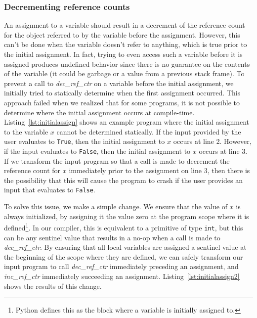 \documentclass{sigplanconf}
\newcommand{\avariable}[1]{\ensuremath{#1}}
\newcommand{\aliteral}[1]{\texttt{#1}}
\newcommand{\afunction}[1]{\textit{#1}}
\newcommand{\atype}[1]{\texttt{#1}}
\begin{document}
\subsubsection{Decrementing reference counts}
An assignment to a variable should result in a decrement of the reference count for the object referred to by the variable before the assignment.  However, this can't be done when the variable doesn't refer to anything, which is true prior to the initial assignment.  In fact, trying to even access such a variable before it is assigned produces undefined behavior since there is no guarantee on the contents of the variable (it could be garbage or a value from a previous stack frame).   To prevent a call to \afunction{dec\_ref\_ctr} on a variable before the initial assignment, we initially tried to statically determine when the first assignment occurred.  This approach failed when we realized that for some programs, it is not possible to determine where the initial assignment occurs at compile-time.  Listing~\ref{lst:initialassign} shows an example program where the initial assignment to the variable \avariable{x} cannot be determined statically.  If the input provided by the user evaluates to \aliteral{True}, then the initial assignment to $x$ occurs at line 2.  However, if the input evaluates to \aliteral{False}, then the initial assignment to \avariable{x} occurs at line 3.  If we transform the input program so that a call is made to decrement the reference count for \avariable{x} immediately prior to the assignment on line 3, then there is the possibility that this will cause the program to crash if the user provides an input that evaluates to \aliteral{False}.

To solve this issue, we make a simple change.  We ensure that the value of \avariable{x} is always initialized, by assigning it the value zero at the program scope where it is defined\footnote{Python defines this as the block where a variable is initially assigned to.}.  In our compiler, this is equivalent to a primitive of type \atype{int}, but this can be any sentinel value that results in a no-op when a call is made to \afunction{dec\_ref\_ctr}.  By ensuring that all local variables are assigned a sentinel value at the beginning of the scope where they are defined, we can safely transform our input program to call \afunction{dec\_ref\_ctr} immediately preceding an assignment, and \afunction{inc\_ref\_ctr} immediately succeeding an assignment.  Listing~\ref{lst:initialassign2} shows the results of this change.
\end{document}
